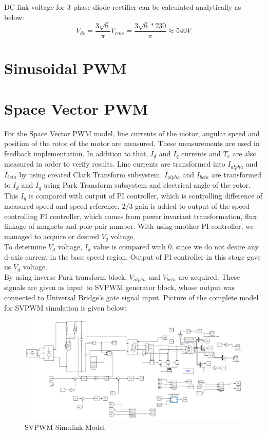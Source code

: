 \documentclass{article}
\newcommand\tab[1][1cm]{\hspace*{#1}}
\begin{document}
\tab DC link voltage for 3-phase diode rectifier can be calculated analytically as below:
\begin{equation}
    V_{dc}=\frac{3\sqrt{6}}{\pi}V_{rms}=\frac{3 \sqrt{6}*230}{\pi} \approx 540 V
\end{equation}

\section{Sinusoidal PWM}
\section{Space Vector PWM}
\tab For the Space Vector PWM model, line currents of the motor, angular speed and position of the rotor of the motor are measured. These measurements are used in feedback implementation. In addition to that, $I_d$ and $I_q$ currents and $T_e$  are also measured in order to verify results. Line currents are transformed into $I_{alpha}$ and $I_{beta}$ by using created Clark Transform subsystem. $I_{alpha}$ and $I_{beta}$ are transformed to $I_d$ and $I_q$ using Park Transform subsystem and electrical angle of the rotor. This $I_q$ is compared with output of PI controller, which is controlling difference of measured speed and speed reference. $2/3$ gain is added to output of the speed controlling PI controller, which comes from power invariant transformation, flux linkage of magnets and pole pair number. With using another PI controller, we managed to acquire or desired $V_q$ voltage. \\
\tab To determine $V_d$ voltage, $I_d$ value is compared with 0, since we do not desire any d-axis current in the base speed region. Output of PI controller in this stage gave us $V_d$ voltage. \\
\tab By using inverse Park transform block, $V_{alpha}$ and $V_{beta}$ are acquired. These signals are given as input to SVPWM generator block, whose output was connected to Universal Bridge's gate signal input. Picture of the complete model for SVPWM simulation is given below:
\begin{figure}[H]
    \centering
    \includegraphics[scale=0.4]{svpwm_simulink.PNG}
    \caption{SVPWM Simulink Model}
    \label{fig:my_label}
\end{figure}
\end{document}
